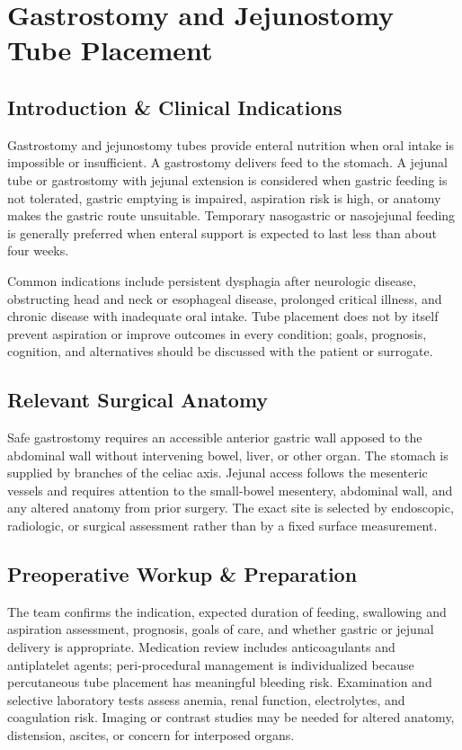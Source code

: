 \chapter{Gastrostomy and Jejunostomy Tube Placement}

\section*{Introduction \& Clinical Indications}
Gastrostomy and jejunostomy tubes provide enteral nutrition when oral intake is impossible or insufficient. A gastrostomy delivers feed to the stomach. A jejunal tube or gastrostomy with jejunal extension is considered when gastric feeding is not tolerated, gastric emptying is impaired, aspiration risk is high, or anatomy makes the gastric route unsuitable. Temporary nasogastric or nasojejunal feeding is generally preferred when enteral support is expected to last less than about four weeks.

Common indications include persistent dysphagia after neurologic disease, obstructing head and neck or esophageal disease, prolonged critical illness, and chronic disease with inadequate oral intake. Tube placement does not by itself prevent aspiration or improve outcomes in every condition; goals, prognosis, cognition, and alternatives should be discussed with the patient or surrogate.

\section*{Relevant Surgical Anatomy}
Safe gastrostomy requires an accessible anterior gastric wall apposed to the abdominal wall without intervening bowel, liver, or other organ. The stomach is supplied by branches of the celiac axis. Jejunal access follows the mesenteric vessels and requires attention to the small-bowel mesentery, abdominal wall, and any altered anatomy from prior surgery. The exact site is selected by endoscopic, radiologic, or surgical assessment rather than by a fixed surface measurement.

\section*{Preoperative Workup \& Preparation}
The team confirms the indication, expected duration of feeding, swallowing and aspiration assessment, prognosis, goals of care, and whether gastric or jejunal delivery is appropriate. Medication review includes anticoagulants and antiplatelet agents; peri-procedural management is individualized because percutaneous tube placement has meaningful bleeding risk. Examination and selective laboratory tests assess anemia, renal function, electrolytes, and coagulation risk. Imaging or contrast studies may be needed for altered anatomy, distension, ascites, or concern for interposed organs.

